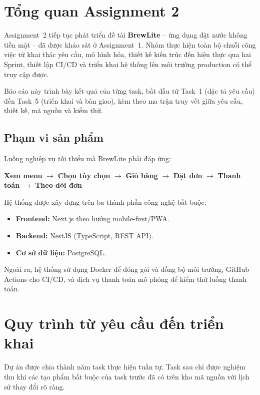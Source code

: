 \documentclass[a4paper]{article}
\begin{document}
\section{Tổng quan Assignment 2}

Assignment~2 tiếp tục phát triển đề tài \textbf{BrewLite} -- ứng dụng đặt nước không tiền mặt -- đã được khảo sát ở Assignment~1.
Nhóm thực hiện toàn bộ chuỗi công việc từ khai thác yêu cầu, mô hình hóa, thiết kế kiến trúc đến hiện thực qua hai Sprint, thiết lập CI/CD và triển khai hệ thống lên môi trường production có thể truy cập được.

Báo cáo này trình bày kết quả của từng task, bắt đầu từ Task~1 (đặc tả yêu cầu) đến Task~5 (triển khai và bàn giao), kèm theo ma trận truy vết giữa yêu cầu, thiết kế, mã nguồn và kiểm thử.

\subsection{Phạm vi sản phẩm}

Luồng nghiệp vụ tối thiểu mà BrewLite phải đáp ứng:

\begin{center}
\textbf{Xem menu} $\rightarrow$ \textbf{Chọn tùy chọn} $\rightarrow$ \textbf{Giỏ hàng} $\rightarrow$ \textbf{Đặt đơn} $\rightarrow$ \textbf{Thanh toán} $\rightarrow$ \textbf{Theo dõi đơn}
\end{center}

Hệ thống được xây dựng trên ba thành phần công nghệ bắt buộc:
\begin{itemize}
    \item \textbf{Frontend:} Next.js theo hướng mobile-first/PWA.
    \item \textbf{Backend:} NestJS (TypeScript, REST API).
    \item \textbf{Cơ sở dữ liệu:} PostgreSQL.
\end{itemize}

Ngoài ra, hệ thống sử dụng Docker để đóng gói và đồng bộ môi trường, GitHub Actions cho CI/CD, và dịch vụ thanh toán mô phỏng để kiểm thử luồng thanh toán.

\section{Quy trình từ yêu cầu đến triển khai}

Dự án được chia thành năm task thực hiện tuần tự. Task sau chỉ được nghiệm thu khi các tạo phẩm bắt buộc của task trước đã có trên kho mã nguồn với lịch sử thay đổi rõ ràng.
\end{document}
